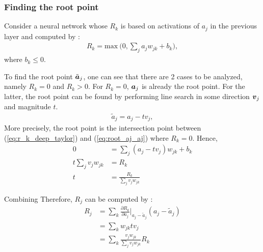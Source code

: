  
 

\subsubsection{Finding the root point}
Consider a neural network whose $R_k$ is based on activations of $a_j$ in the previous layer and computed by :
\begin{align}\label{eq:r_k_deep_taylor}
R_k = \text{max}\ \bigg(0, \sum_{j} a_j w_{jk}  + b_k \bigg),
\end{align}
where $b_k \le 0 $.

To find the root point $\tilde{\patvector{a}}_j$, one can see that  there are  2 cases to be analyzed, namely $R_k = 0$ and $R_k > 0$. For $R_k=0$,  $\patvector{a}_j$ is already the root point. For the latter, the root point can be found by performing  line search in  some direction $\patvector{v}_j$ and magnitude $t$.
\begin{align}\label{eq:root_aj_aj}
\tilde{a}_j = a_j - t v_j,
\end{align}
More precisely, the root point is the intersection point between (\ref{eq:r_k_deep_taylor}) and (\ref{eq:root_aj_aj}) where $R_k=0$. Hence,
\begin{align}
  0 &= 	\sum_{j} (a_j - t v_j) w_{jk}  + b_k\\
  t \sum_{j} v_j w_{jk} &= R_k \\
  t &= \frac{R_k}{\sum_{j} v_j w_{jk}}
\end{align}

Combining
Therefore, $R_j$ can be computed by :
\begin{align}
R_j &= \sum_k	\frac{\partial  R_k }{ \partial a_j } \bigg|_{ a_j - \tilde{a}_j }  ( a_j - \tilde{a}_j ) \\
&=	\sum_k w_{jk} tv_j \\
&=	\sum_k \frac{ v_j w_{jk}   }{\sum_{j} v_j w_{jk}}  R_k
\end{align}

